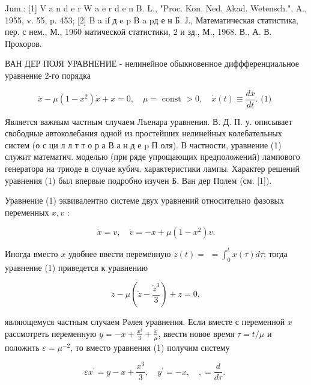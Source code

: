 \documentclass[10pt]{article}
\begin{document}
Jum.: [1] V a n d e r W a e r d e n B. L., "Proc. Kon. Ned. Akad. Wetensch.", A., 1955, v. 55, p. 453; [2] B a if д e p B a pд е н Б. Ј., Математическая статистика, пер. с нем., М., 1960 матической статистики, 2 и зд., М., 1968. В., А. В. Прохоров.



ВАН ДЕР ПОЈЯ УРАВНЕНИЕ - нелинейное обыкновенное диффференциальное уравнение 2-го порядка



\[

\ddot{x}-\mu\left(1-x^{2}\right) \dot{x}+x=0, \quad \mu=\text { const }>0, \quad \dot{x}(t) \equiv \frac{d x}{d t} \text {. (1) }

\]



Является важным частным случаем Лъенара уравнения. В. Д. П. у. описывает свободные автоколебания одной из простейших нелинейных колебательных систем (о с ци л л т т о р а В а н д е $\mathrm{p}$ П оля). В частности, уравнение (1) служит математич. моделью (при ряде упрощающих предположений) лампового генератора на триоде в случае кубич. характеристики лампы. Характер решений уравнения (1) был впервые подробно изучен Б. Ван дер Полем (см. [1]).



Уравнение (1) эквивалентно системе двух уравнений относительно фазовых переменных $x, v$ :



\[

\dot{x}=v, \quad \dot{v}=-x+\mu\left(1-x^{2}\right) v .

\]



Иногда вместо $x$ удобнее ввести переменную $z(t)=$ $=\int_{0}^{t} x(\tau) d \tau$; тогда уравнение (1) приведется к уравнению



\[

\ddot{z}-\mu\left(\dot{z}-\frac{\dot{z}^{3}}{3}\right)+z=0,

\]



являющемуся частным случаем Рәлея уравнения. Если вместе с переменной $x$ рассмотреть переменную $y=-x+\frac{x^{3}}{3}+\frac{\dot{x}}{\mu}$, ввести новое время $\tau=t / \mu$ и положить $\varepsilon=\mu^{-2}$, то вместо уравнения (1) получим систему



\[

\varepsilon x^{\prime}=y-x+\frac{x^{3}}{3}, \quad y^{\prime}=-x, \quad,=\frac{d}{d \tau} \text {. }

\]
\end{document}
